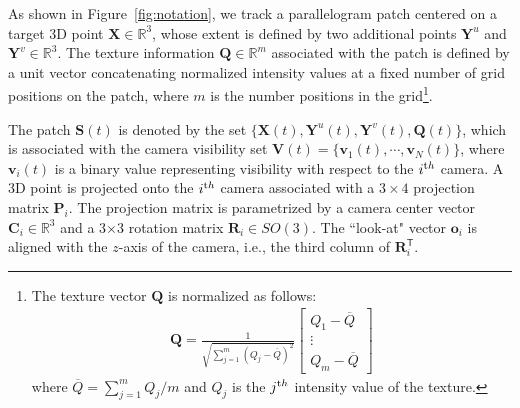 As shown in Figure~\ref{fig:notation}, we track a parallelogram patch centered on a target 3D point $\mathbf{X} \in \mathds{R}^3$, whose extent is defined by two additional points $\mathbf{Y}^u$ and $\mathbf{Y}^v \in \mathds{R}^3$. The texture information $\mathbf{Q} \in \mathds{R}^m$ associated with the patch is defined by a unit vector concatenating normalized intensity values at a fixed number of grid positions on the patch, where $m$ is the number positions in the grid\footnote{The texture vector $\mathbf{\mathbf{Q}}$ is normalized as follows:
	\begin{eqnarray}
	\mathbf{Q} = \frac{1}{\sqrt{\sum_{j=1}^m (Q_j-\overline{Q})^2}} \left[\begin{array}{c}Q_1-\overline{Q}\\\vdots\\ Q_m-\overline{Q} \end{array}\right] \label{Eq:normalized_texture}
	\end{eqnarray}
	where $\overline{Q} = \sum_{j=1}^m Q_j / m$ and $Q_j$ is the $j^{\textrm th}$ intensity value of the texture.}. 

The patch $\mathbf{S}(t)$ is denoted by the set $\{\mathbf{X}(t), \mathbf{Y}^u(t), \mathbf{Y}^v(t),\mathbf{Q}(t)\}$, which is associated with the camera visibility set $\mathbf{V}(t) = \{\mathbf{v}_1(t),\cdots,\mathbf{v}_N(t)\}$, where $\mathbf{v}_i(t)$ is a binary value representing visibility with respect to  the $i^{\textrm th}$ camera. %
A 3D point is projected onto the $i^{\textrm th}$ camera associated with a $3\times4$ projection matrix $\mathbf{P}_i$. The projection matrix is parametrized by a camera center vector $\mathbf{C}_i \in \mathds{R}^3$ and a 3$\times$3 rotation matrix $\mathbf{R}_i \in SO(3)$. The ``look-at" vector $\mathbf{o}_i$ is aligned with the $z$-axis of the camera, i.e., the third column of $\mathbf{R}_i^\mathsf{T}$. 

